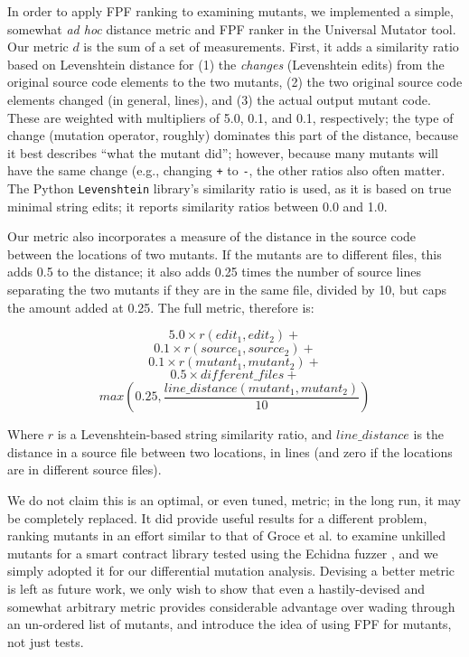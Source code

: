 In order to apply FPF ranking to examining mutants, we implemented a
simple, somewhat \emph{ad hoc} distance metric and FPF ranker in the
Universal Mutator \cite{universalmutator} tool.  Our metric $d$ is
the sum of a set of measurements.  First, it adds a similarity
ratio based on Levenshtein distance \cite{lev} for (1) the \emph{changes} (Levenshtein edits) from
the original source code elements to
the two mutants,  (2) the two original source code elements changed (in
general, lines), and (3) the actual output mutant code.  These are
weighted with multipliers of 5.0, 0.1, and 0.1, respectively; the type
of change (mutation operator, roughly) dominates this part of the
distance, because it best describes ``what the mutant did''; however,
because many mutants will have the same change (e.g., changing {\tt +}
to {\tt -}, the other ratios also often matter.  The Python
{\tt Levenshtein} library's similarity ratio is used, as it is based
on true minimal string edits; it reports similarity ratios between 0.0
and 1.0.

Our metric also incorporates a measure of the distance in the source
code between the locations of two mutants.  If the mutants are to
different files, this adds 0.5 to the distance; it also adds 0.25
times the number of source lines separating the two mutants if they
are in the same file, divided by 10, but caps the amount added at
0.25.  The full metric, therefore is:

$$ 5.0 \times r(\mathit{edit}_1, \mathit{edit}_2) +$$
$$0.1 \times r(\mathit{source}_1, \mathit{source}_2) +$$
$$0.1 \times r(\mathit{mutant}_1, \mathit{mutant}_2) +$$
$$0.5 \times \mathit{different\_files} +$$
$$max(0.25, \frac{\mathit{line\_distance}(\mathit{mutant}_1, \mathit{mutant}_2)}{10})$$

\noindent Where $r$ is a Levenshtein-based string similarity ratio,
and $\mathit{line\_distance}$ is the distance in a source file between
two locations, in lines (and zero if the locations are in different
source files).

We do not claim this is an optimal, or even tuned, metric; in the long run, it may be completely replaced.  It did
provide useful results for a different problem, ranking mutants in an
effort similar to that of Groce et
al. \cite{groce2015verified,groce2018verified} to examine unkilled
mutants for a smart contract library tested using the Echidna fuzzer \cite{echidna-code},
and we simply adopted it for our differential mutation analysis.
Devising a better metric is left as future work, we only wish to show
that even a hastily-devised and somewhat arbitrary metric provides
considerable advantage over wading through an un-ordered list of
mutants, and introduce the idea of using FPF for mutants, not just tests.